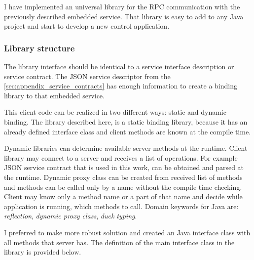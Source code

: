 I have implemented an universal library for the RPC communication with the
previously described embedded service. That library is easy to add to any Java
project and start to develop a new control application. 

\subsubsection{Library structure}

The library interface should be identical to a service interface description
or service contract. The JSON service descriptor from the
\autoref{sec:appendix_service_contracts} has enough information to create a
binding library to that embedded service.

This client code can be realized in two different ways: static and dynamic binding.
The library described here, is a static binding library, because it has an already 
defined interface class and client methods are known at the compile time.

Dynamic libraries can determine available server methods at the runtime. Client
library may connect to a server and receives a list of operations. For example JSON
service contract that is used in this work, can be obtained and parsed at the runtime. Dynamic proxy
class can be created from received list of methods and methods can be called
only by a name without the compile time checking. Client may know only a method
name or a part of that name and decide while application is running, which
methods to call. Domain keywords for Java are: \textit{reflection}, \textit{dynamic proxy
class}, \textit{duck typing}.

I preferred to make more robust solution and created an Java interface class with
all methods that server has. The definition of the main interface class in the library is provided below.

